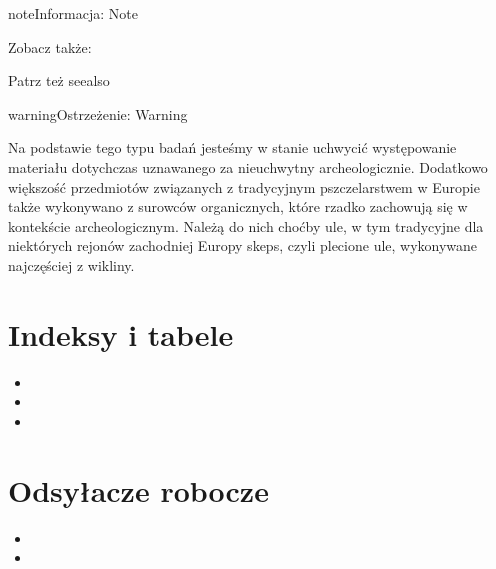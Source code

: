 \documentclass[letterpaper,10pt,polish]{sphinxmanual}
\let\sphinxpxdimen\pdfpxdimen\else\newdimen\sphinxpxdimen
\begin{document}
\sphinxAtStartPar
\sphinxincludegraphics[width=100\sphinxpxdimen]{{hha}.jpg}

\begin{sphinxadmonition}{note}{Informacja:}
\sphinxAtStartPar
Note
\end{sphinxadmonition}


\begin{sphinxseealso}{Zobacz także:}

\sphinxAtStartPar
Patrz też seealso


\end{sphinxseealso}


\begin{sphinxadmonition}{warning}{Ostrzeżenie:}
\sphinxAtStartPar
Warning
\end{sphinxadmonition}

\sphinxAtStartPar
{}

\sphinxAtStartPar
Na podstawie tego typu badań jesteśmy w stanie uchwycić występowanie materiału dotychczas uznawanego za nieuchwytny archeologicznie. Dodatkowo większość przedmiotów związanych z tradycyjnym pszczelarstwem w Europie także wykonywano z surowców organicznych, które rzadko zachowują się w kontekście archeologicznym. Należą do nich choćby ule, w tym tradycyjne dla niektórych rejonów zachodniej Europy skeps, czyli plecione ule, wykonywane najczęściej z wikliny.


\chapter{Indeksy i tabele}
\label{\detokenize{index:indeksy-i-tabele}}\begin{itemize}
\item {} 
\sphinxAtStartPar
{}

\item {} 
\sphinxAtStartPar
{}

\item {} 
\sphinxAtStartPar
{}

\end{itemize}


\chapter{Odsyłacze robocze}
\label{\detokenize{index:odsylacze-robocze}}\begin{itemize}
\item {} 
\sphinxAtStartPar
{}

\item {} 
\sphinxAtStartPar
{}

\end{itemize}



\renewcommand{\indexname}{Indeks}
\printindex
\end{document}

